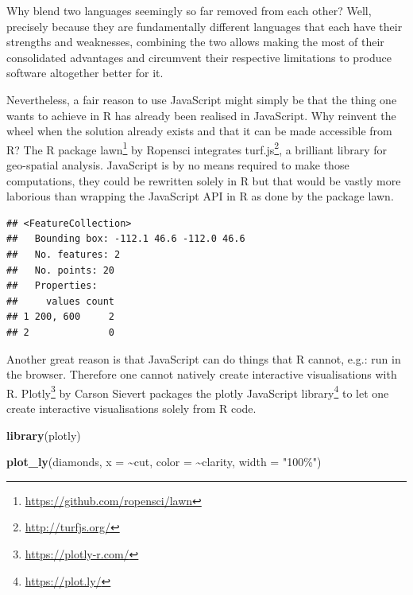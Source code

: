 \documentclass[
]{krantz}
\makeatletter
\newenvironment{Shaded}{\begin{snugshade}}{\end{snugshade}}
\newcommand{\DataTypeTok}[1]{\textcolor[rgb]{0.27,0.27,0.27}{#1}}
\newcommand{\KeywordTok}[1]{\textcolor[rgb]{0.27,0.27,0.27}{\textbf{#1}}}
\newcommand{\NormalTok}[1]{#1}
\newcommand{\OperatorTok}[1]{\textcolor[rgb]{0.43,0.43,0.43}{\textbf{#1}}}
\newcommand{\StringTok}[1]{\textcolor[rgb]{0.5,0.5,0.5}{#1}}
\renewcommand{\href}[2]{#2\footnote{\url{#1}}}
\newenvironment{kframe}{%
\medskip{}
\setlength{\fboxsep}{.8em}
 \def\at@end@of@kframe{}%
 \ifinner\ifhmode%
  \def\at@end@of@kframe{\end{minipage}}%
  \begin{minipage}{\columnwidth}%
 \fi\fi%
 \def\FrameCommand##1{\hskip\@totalleftmargin \hskip-\fboxsep
 \colorbox{shadecolor}{##1}\hskip-\fboxsep
     \hskip-\linewidth \hskip-\@totalleftmargin \hskip\columnwidth}%
 \MakeFramed {\advance\hsize-\width
   \@totalleftmargin\z@ \linewidth\hsize
   \@setminipage}}%
 {\par\unskip\endMakeFramed%
 \at@end@of@kframe}
\renewenvironment{Shaded}{\begin{kframe}}{\end{kframe}}
\makeatother
\begin{document}
Why blend two languages seemingly so far removed from each other? Well, precisely because they are fundamentally different languages that each have their strengths and weaknesses, combining the two allows making the most of their consolidated advantages and circumvent their respective limitations to produce software altogether better for it.

Nevertheless, a fair reason to use JavaScript might simply be that the thing one wants to achieve in R has already been realised in JavaScript. Why reinvent the wheel when the solution already exists and that it can be made accessible from R? The R package \href{https://github.com/ropensci/lawn}{lawn} \citep{R-lawn} by Ropensci integrates \href{http://turfjs.org/}{turf.js}, a brilliant library for geo-spatial analysis. JavaScript is by no means required to make those computations, they could be rewritten solely in R but that would be vastly more laborious than wrapping the JavaScript API in R as done by the package lawn.

\begin{Shaded}
\end{Shaded}

\begin{verbatim}
## <FeatureCollection>
##   Bounding box: -112.1 46.6 -112.0 46.6
##   No. features: 2
##   No. points: 20
##   Properties: 
##     values count
## 1 200, 600     2
## 2              0
\end{verbatim}

Another great reason is that JavaScript can do things that R cannot, e.g.: run in the browser. Therefore one cannot natively create interactive visualisations with R. \href{https://plotly-r.com/}{Plotly} \citep{R-plotly} by Carson Sievert packages the \href{https://plot.ly/}{plotly JavaScript library} to let one create interactive visualisations solely from R code.

\begin{Shaded}
\begin{Highlighting}[]
\KeywordTok{library}\NormalTok{(plotly)}

\KeywordTok{plot\_ly}\NormalTok{(diamonds, }\DataTypeTok{x =} \OperatorTok{\textasciitilde{}}\NormalTok{cut, }\DataTypeTok{color =} \OperatorTok{\textasciitilde{}}\NormalTok{clarity, }\DataTypeTok{width =} \StringTok{"100\%"}\NormalTok{)}
\end{Highlighting}
\end{Shaded}
\end{document}
